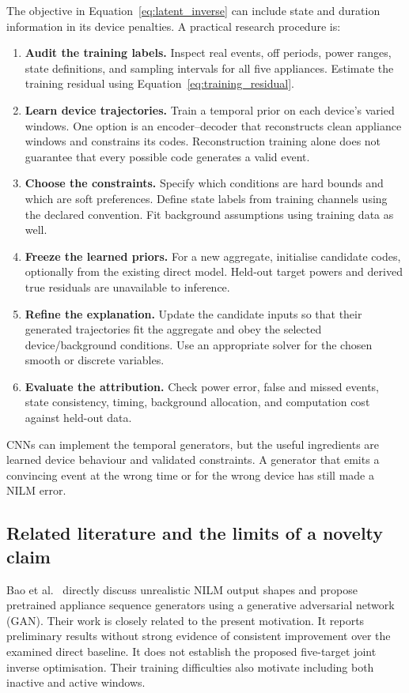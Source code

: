 \documentclass[11pt]{article}
\begin{document}
The objective in Equation~\eqref{eq:latent_inverse} can include state and duration information in its device penalties. A practical research procedure is:
\begin{enumerate}
    \item \textbf{Audit the training labels.} Inspect real events, off periods, power ranges, state definitions, and sampling intervals for all five appliances. Estimate the training residual using Equation~\eqref{eq:training_residual}.
    \item \textbf{Learn device trajectories.} Train a temporal prior on each device's varied windows. One option is an encoder--decoder that reconstructs clean appliance windows and constrains its codes. Reconstruction training alone does not guarantee that every possible code generates a valid event.
    \item \textbf{Choose the constraints.} Specify which conditions are hard bounds and which are soft preferences. Define state labels from training channels using the declared convention. Fit background assumptions using training data as well.
    \item \textbf{Freeze the learned priors.} For a new aggregate, initialise candidate codes, optionally from the existing direct model. Held-out target powers and derived true residuals are unavailable to inference.
    \item \textbf{Refine the explanation.} Update the candidate inputs so that their generated trajectories fit the aggregate and obey the selected device/background conditions. Use an appropriate solver for the chosen smooth or discrete variables.
    \item \textbf{Evaluate the attribution.} Check power error, false and missed events, state consistency, timing, background allocation, and computation cost against held-out data.
\end{enumerate}
CNNs can implement the temporal generators, but the useful ingredients are learned device behaviour and validated constraints. A generator that emits a convincing event at the wrong time or for the wrong device has still made a NILM error.

\subsection{Related literature and the limits of a novelty claim}

Bao et al.~\cite{bao2018} directly discuss unrealistic NILM output shapes and propose pretrained appliance sequence generators using a generative adversarial network (GAN). Their work is closely related to the present motivation. It reports preliminary results without strong evidence of consistent improvement over the examined direct baseline. It does not establish the proposed five-target joint inverse optimisation. Their training difficulties also motivate including both inactive and active windows.
\end{document}
